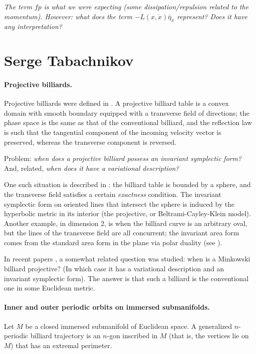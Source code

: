 \documentclass[11pt]{article}
\theoremstyle{definition}
\begin{document}
\medskip
\medskip

 {\it The term $f p$ is what we were expecting (some dissipation/repulsion related to the momentum). However: what does the term $ - L(x,\dot{x}) \bar{\eta}_x$ represent? Does it have any interpretation?}


\section*{Serge Tabachnikov}

\paragraph{Projective billiards.} Projective billiards were defined in \cite{Ta97}. A projective billiard table is a convex domain with smooth boundary equipped with a transverse field of directions; the phase space is the same as that of the conventional billiard, and the reflection law is such that the tangential component of the incoming velocity vector is preserved, whereas the transverse component is reversed. 

Problem: {\it when does a projective billiard possess an invariant symplectic form?} And, related, {\it when does it have a variational description?}

One such situation is described in \cite{Ta97-1}: the billiard table is bounded by a sphere, and the transverse field satisfies a certain {\it exactness} condition. The invariant symplectic form on oriented lines that intersect the sphere is induced by the hyperbolic metric in its interior (the projective, or Beltrami-Cayley-Klein model).
Another example, in dimension 2, is when the billiard curve is an arbitrary oval, but the lines of the transverse field are all concurrent; the invariant area form comes from the standard area form in the plane via polar duality (see \cite{Ta97}).

In recent papers \cite{Glu,GM}, a somewhat related question was studied: when is a Minkowski billiard projective? (In which case it has a variational description and an invariant symplectic form). The answer is that such a billiard is the conventional one in some Euclidean metric. 

\paragraph{Inner and outer periodic orbits on immersed submanifolds.} Let $M$ be a closed immersed submanifold of Euclidean space. A generalized $n$-periodic billiard trajectory is an $n$-gon inscribed in $M$ (that is, the vertices lie on $M$) that has an extremal perimeter. 
\end{document}
